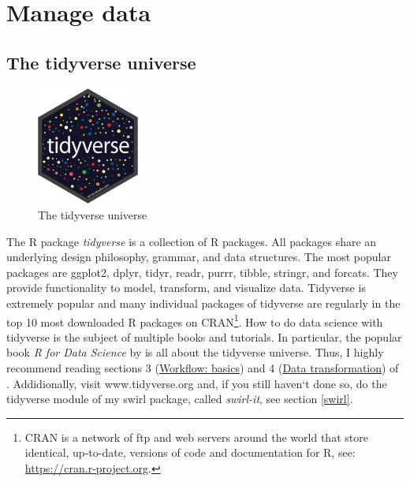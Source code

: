 \documentclass[
  12pt,
  oneside]{book}
\theoremstyle{definition}
\theoremstyle{definition}
\theoremstyle{definition}
\theoremstyle{definition}
\theoremstyle{remark}
\begin{document}
\hypertarget{manage-data}{%
\chapter{Manage data}\label{manage-data}}

\hypertarget{the-tidyverse-universe}{%
\section{The tidyverse universe}\label{the-tidyverse-universe}}

\begin{figure}
\centering
\includegraphics[width=0.3\textwidth,height=\textheight]{fig/tidyverse-logo.png}
\caption{\label{fig:tidyverse-logo} The tidyverse universe}
\end{figure}

The R package \emph{tidyverse} is a collection of R packages. All packages share an underlying design philosophy, grammar, and data structures.
The most popular packages are ggplot2, dplyr, tidyr, readr, purrr, tibble, stringr, and forcats. They provide functionality to model, transform, and visualize data. Tidyverse is extremely popular and many individual packages of tidyverse are regularly in the top 10 most downloaded R packages on CRAN\footnote{CRAN is a network of ftp and web servers around the world that store identical, up-to-date, versions of code and documentation for R, see: \url{https://cran.r-project.org}.}. How to do data science with tidyverse is the subject of multiple books and tutorials. In particular, the popular book \emph{R for Data Science} by \citet{Wickham2023R} is all about the tidyverse universe. Thus, I highly recommend reading sections 3 (\href{https://r4ds.hadley.nz/workflow-basics.html}{Workflow: basics}) and 4 (\href{https://r4ds.hadley.nz/data-transform.html}{Data transformation}) of \citet{Wickham2023R}. Addidionally, visit www.tidyverse.org and, if you still haven`t done so, do the tidyverse module of my swirl package, called \emph{swirl-it}, see section \ref{swirl}.
\end{document}
